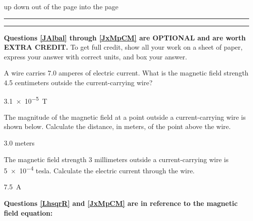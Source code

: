 \documentclass[]{exam}
\begin{document}
\begin{questions}
\begin{randomizeoneparchoices}
    \correctchoice up
    \choice down
    \choice out of the page
    \choice into the page
\end{randomizeoneparchoices}

\clearpage

\vspace{1em}

\hrule\hrule

\begin{EnvUplevel}
\textbf{Questions \ref{JAlbal} through \ref{JxMpCM} are OPTIONAL and are worth EXTRA CREDIT.} To get full credit, show all your work on a sheet of paper, express your answer with correct units, and box your answer.
\end{EnvUplevel}

\question \label{JAlbal}
A wire carries 7.0 amperes of electric current. What is the magnetic field strength 4.5 centimeters outside the current-carrying wire? %

\begin{solution}
    \SI{3.1e-5}{T}
\end{solution}

\question
The magnitude of the magnetic field at a point outside a current-carrying wire is shown below. Calculate the distance, in meters, of the point above the wire.

\begin{center}
\end{center}

\begin{solution}
    3.0 meters
\end{solution}

\question
The magnetic field strength 3 millimeters outside a current-carrying wire is \num{5e-4} tesla. Calculate the electric current through the wire.

\begin{solution}
    \SI{7.5}{A}
\end{solution}

\begin{EnvUplevel}
    \textbf{Questions \ref{LhsqrR} and \ref{JxMpCM} are in reference to the magnetic field equation:}
\end{EnvUplevel}


\end{questions}
\end{document}
